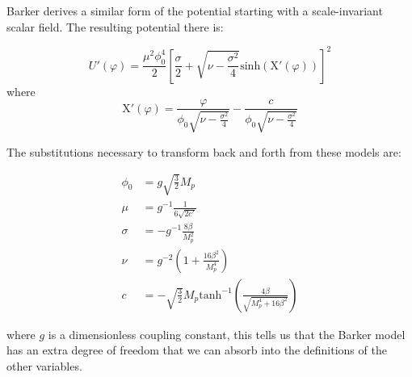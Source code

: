\documentclass[aps,prd,reprint,preprintnumbers,showpacs,floatfix,nofootinbib,superscript address]{revtex4-2}
\begin{document}
Barker \cite{barker2024poincaregaugetheoryconformal} derives a similar form of the potential starting with a scale-invariant scalar field. The resulting potential there is:

\begin{equation}
    U'(\varphi) = \frac{\mu^2 \phi_{0}^{4}}{2} \left[ \frac{\sigma}{2} + \sqrt{\nu - \frac{\sigma^2}{4}} \text{sinh}\left( \text{X}'(\varphi) \right)  \right]^2
\end{equation}
where
\begin{equation}
    \text{X}'(\varphi) =  \frac{\varphi}{\phi_0 \sqrt{\nu - \frac{\sigma^2}{4}}} - \frac{c}{\phi_0 \sqrt{\nu - \frac{\sigma^2}{4}}}
\end{equation}

The substitutions necessary to transform back and forth from these models are: 

\begin{align}
    \phi_0 &= g \sqrt{\frac{3}{2}} M_p  \nonumber \\
    \mu &= g^{-1} \frac{1}{6 \sqrt{2 c'}}  \nonumber \\
    \sigma &= - g^{-1} \frac{8 \beta}{M_{p}^{2}}  \nonumber \\
    \nu &= g^{-2} \left( 1 + \frac{16 \beta^2}{M_{p}^{4}} \right) \nonumber \\
    c  &= -\sqrt{\frac{3}{2}} M_{p} \text{tanh}^{-1} \left(\frac{4 \beta}{\sqrt{M_{p}^{4}+16 \beta^2}} \right)
\end{align}

where $g$ is a dimensionless coupling constant, this tells us that the Barker model has an extra degree of freedom that we can absorb into the definitions of the other variables.
\end{document}

